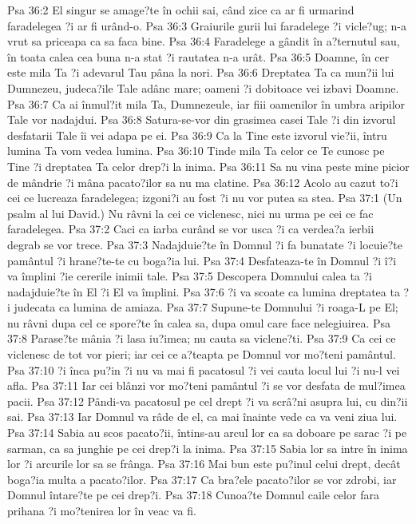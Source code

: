 Psa 36:2  El singur se amage?te în ochii sai, când zice ca ar fi urmarind faradelegea ?i ar fi urând-o.
Psa 36:3  Graiurile gurii lui faradelege ?i vicle?ug; n-a vrut sa priceapa ca sa faca bine.
Psa 36:4  Faradelege a gândit în a?ternutul sau, în toata calea cea buna n-a stat ?i rautatea n-a urât.
Psa 36:5  Doamne, în cer este mila Ta ?i adevarul Tau pâna la nori.
Psa 36:6  Dreptatea Ta ca mun?ii lui Dumnezeu, judeca?ile Tale adânc mare; oameni ?i dobitoace vei izbavi Doamne.
Psa 36:7  Ca ai înmul?it mila Ta, Dumnezeule, iar fiii oamenilor în umbra aripilor Tale vor nadajdui.
Psa 36:8  Satura-se-vor din grasimea casei Tale ?i din izvorul desfatarii Tale îi vei adapa pe ei.
Psa 36:9  Ca la Tine este izvorul vie?ii, întru lumina Ta vom vedea lumina.
Psa 36:10  Tinde mila Ta celor ce Te cunosc pe Tine ?i dreptatea Ta celor drep?i la inima.
Psa 36:11  Sa nu vina peste mine picior de mândrie ?i mâna pacato?ilor sa nu ma clatine.
Psa 36:12  Acolo au cazut to?i cei ce lucreaza faradelegea; izgoni?i au fost ?i nu vor putea sa stea.
Psa 37:1  (Un psalm al lui David.) Nu râvni la cei ce viclenesc, nici nu urma pe cei ce fac faradelegea.
Psa 37:2  Caci ca iarba curând se vor usca ?i ca verdea?a ierbii degrab se vor trece.
Psa 37:3  Nadajduie?te în Domnul ?i fa bunatate ?i locuie?te pamântul ?i hrane?te-te cu boga?ia lui.
Psa 37:4  Desfateaza-te în Domnul ?i î?i va împlini ?ie cererile inimii tale.
Psa 37:5  Descopera Domnului calea ta ?i nadajduie?te în El ?i El va împlini.
Psa 37:6  ?i va scoate ca lumina dreptatea ta ?i judecata ca lumina de amiaza.
Psa 37:7  Supune-te Domnului ?i roaga-L pe El; nu râvni dupa cel ce spore?te în calea sa, dupa omul care face nelegiuirea.
Psa 37:8  Parase?te mânia ?i lasa iu?imea; nu cauta sa viclene?ti.
Psa 37:9  Ca cei ce viclenesc de tot vor pieri; iar cei ce a?teapta pe Domnul vor mo?teni pamântul.
Psa 37:10  ?i înca pu?in ?i nu va mai fi pacatosul ?i vei cauta locul lui ?i nu-l vei afla.
Psa 37:11  Iar cei blânzi vor mo?teni pamântul ?i se vor desfata de mul?imea pacii.
Psa 37:12  Pândi-va pacatosul pe cel drept ?i va scrâ?ni asupra lui, cu din?ii sai.
Psa 37:13  Iar Domnul va râde de el, ca mai înainte vede ca va veni ziua lui.
Psa 37:14  Sabia au scos pacato?ii, întins-au arcul lor ca sa doboare pe sarac ?i pe sarman, ca sa junghie pe cei drep?i la inima.
Psa 37:15  Sabia lor sa intre în inima lor ?i arcurile lor sa se frânga.
Psa 37:16  Mai bun este pu?inul celui drept, decât boga?ia multa a pacato?ilor.
Psa 37:17  Ca bra?ele pacato?ilor se vor zdrobi, iar Domnul întare?te pe cei drep?i.
Psa 37:18  Cunoa?te Domnul caile celor fara prihana ?i mo?tenirea lor în veac va fi.
